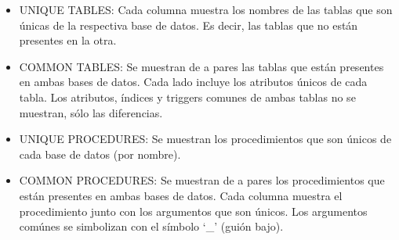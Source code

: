 \documentclass[11pt]{article}
\begin{document}
\begin{itemize}
	\item UNIQUE TABLES: Cada columna muestra los nombres de las tablas que son únicas de la respectiva base de datos. Es decir, las tablas que no están presentes en la otra.
	\item COMMON TABLES: Se muestran de a pares las tablas que están presentes en ambas bases de datos. Cada lado incluye los atributos únicos de cada tabla. Los atributos, índices y triggers comunes de ambas tablas no se muestran, sólo las diferencias.
	\item UNIQUE PROCEDURES: Se muestran los procedimientos que son únicos de cada base de datos (por nombre).
	\item COMMON PROCEDURES: Se muestran de a pares los procedimientos que están presentes en ambas bases de datos. Cada columna muestra el procedimiento junto con los argumentos que son únicos. Los argumentos comúnes se simbolizan con el símbolo `\_' (guión bajo).
\end{itemize}
\end{document}
